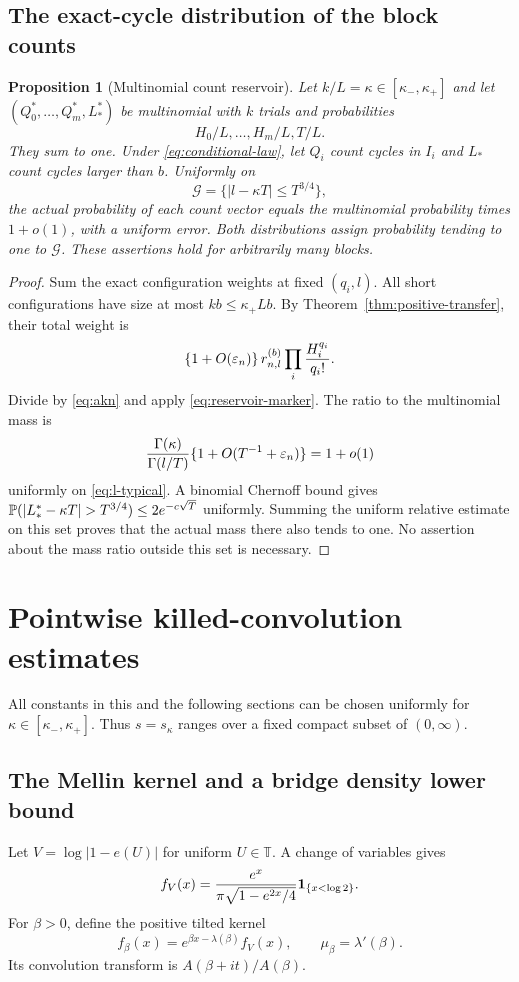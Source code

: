 \documentclass[11pt]{article}
\newtheorem{proposition}[theorem]{Proposition}
\theoremstyle{definition}\newtheorem{definition}[theorem]{Definition}
\theoremstyle{remark}\newtheorem{remark}[theorem]{Remark}
\newcommand{\T}{\mathbb T}\newcommand{\R}{\mathbb R}\newcommand{\C}{\mathbb C}
\numberwithin{equation}{section}\allowdisplaybreaks
\begin{document}
\subsection{The exact-cycle distribution of the block counts}
\begin{proposition}[Multinomial count reservoir]\label{prop:multinomial}
Let $k/L=\kappa\in[\kappa_-,\kappa_+]$ and let
$(Q_0^*,\ldots,Q_m^*,L_*^*)$ be multinomial with $k$ trials and
probabilities
\begin{equation}\label{eq:multi-probs}
 H_0/L,\ldots,H_m/L,T/L.
\end{equation}
They sum to one. Under \eqref{eq:conditional-law}, let $Q_i$ count cycles
in $I_i$ and $L_*$ count cycles larger than $b$. Uniformly on
\begin{equation}\label{eq:l-typical}
 \mathcal G=\{|l-\kappa T|\le T^{3/4}\},
\end{equation}
the actual probability of each count vector equals the multinomial
probability times $1+o(1)$, with a uniform error. Both distributions assign
probability tending to one to $\mathcal G$. These assertions hold for
arbitrarily many blocks.
\end{proposition}
\begin{proof}
Sum the exact configuration weights at fixed $(q_i,l)$. All short
configurations have size at most $kb\le\kappa_+Lb$. By
Theorem~\ref{thm:positive-transfer}, their total weight is
\[
 \{1+O(\varepsilon_n)\}\,r_{n,l}^{(b)}\prod_i\frac{H_i^{q_i}}{q_i!}.
\]
Divide by \eqref{eq:akn} and apply \eqref{eq:reservoir-marker}. The ratio
to the multinomial mass is
\[
 \frac{\Gamma(\kappa)}{\Gamma(l/T)}
       \{1+O(T^{-1}+\varepsilon_n)\}=1+o(1)
\]
uniformly on \eqref{eq:l-typical}. A binomial Chernoff bound gives
$\Pp(|L_*^*-\kappa T|>T^{3/4})\le2e^{-c\sqrt T}$ uniformly.
Summing the uniform relative estimate on this set proves that the actual
mass there also tends to one. No assertion about the mass ratio outside
this set is necessary.
\end{proof}

\section{Pointwise killed-convolution estimates}
\label{sec:kernel}
All constants in this and the following sections can be chosen uniformly
for $\kappa\in[\kappa_-,\kappa_+]$. Thus $s=s_\kappa$ ranges over a
fixed compact subset of $(0,\infty)$.

\subsection{The Mellin kernel and a bridge density lower bound}
Let $V=\log|1-e(U)|$ for uniform $U\in\T$. A change of variables gives
\begin{equation}\label{eq:Vdensity}
 f_V(x)=\frac{e^x}{\pi\sqrt{1-e^{2x}/4}}\mathbf1_{\{x<\log2\}}.
\end{equation}
For $\beta>0$, define the positive tilted kernel
\begin{equation}\label{eq:tilt-kernel}
 f_\beta(x)=e^{\beta x-\lambda(\beta)}f_V(x),\qquad
 \mu_\beta=\lambda'(\beta).
\end{equation}
Its convolution transform is $A(\beta+it)/A(\beta)$.
\end{document}
